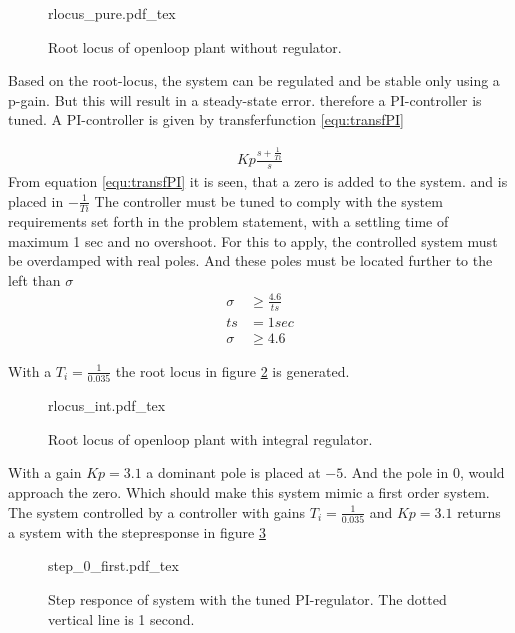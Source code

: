 \documentclass[../../../Main]{subfiles}
\begin{document}
\begin{figure}[H]
\centering
\def\svgwidth{\textwidth}
{rlocus_pure.pdf_tex}
\caption{Root locus of openloop plant without regulator.}
\label{fig:rlocus_pure}
\end{figure}

Based on the root-locus, the system can be regulated and be stable only using a p-gain. 
But this will result in a steady-state error. therefore a PI-controller is tuned. 
A PI-controller is given by transferfunction \eqref{equ:transfPI}

\begin{align}
	Kp \frac{s+\frac{1}{Ti}}{s}
	\label{equ:transfPI}
\end{align}
From equation \eqref{equ:transfPI} it is seen, that a zero is added to the system.
and is placed in $-\frac{1}{Ti} $
The controller must be tuned to comply with the system requirements set forth in the problem statement, with a settling time of maximum 1 sec and no overshoot. For this to apply, the controlled system must be overdamped with real poles. And these poles must be located further to the left than $\sigma$
\begin{align}
	\sigma &\ge \frac{4.6}{ts}\\
	ts &= 1 sec\\
	\sigma &\ge 4.6
\end{align}

With a $T_i = \frac{1}{0.035}$ the root locus in figure \ref{fig:rlocus_int} is generated.

\begin{figure}[H]
\centering
\def\svgwidth{\textwidth}
{rlocus_int.pdf_tex}
\caption{Root locus of openloop plant with integral regulator.}
\label{fig:rlocus_int}
\end{figure}

With a gain $Kp = 3.1$ a dominant pole is placed at $-5$. And the pole in 0, would approach the zero. Which should make this system mimic a first order system. The system controlled by a controller with gains $T_i = \frac{1}{0.035}$ and $Kp = 3.1$ returns a system with the stepresponse in figure \ref{fig:step_0_first}

\begin{figure}[H]
\centering
\def\svgwidth{\textwidth}
{step_0_first.pdf_tex}
\caption{Step responce of system with the tuned PI-regulator. The dotted vertical line is 1 second.}
\label{fig:step_0_first}
\end{figure}
\end{document}

